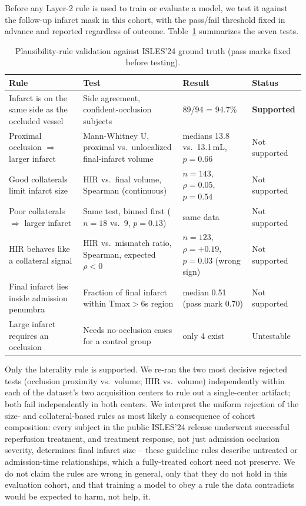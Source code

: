 \documentclass[conference]{IEEEtran}
\begin{document}
Before any Layer-2 rule is used to train or evaluate a model, we test it against the follow-up infarct mask in this cohort, with the pass/fail threshold fixed in advance and reported regardless of outcome. Table~\ref{tab:rules} summarizes the seven tests.

\begin{table}[t]
\centering
\caption{Plausibility-rule validation against ISLES'24 ground truth (pass marks fixed before testing).}
\label{tab:rules}
\begin{tabular}{p{4.6cm}p{4.6cm}p{3.2cm}p{2cm}}
\toprule
\textbf{Rule} & \textbf{Test} & \textbf{Result} & \textbf{Status} \\
\midrule
Infarct is on the same side as the occluded vessel & Side agreement, confident-occlusion subjects & 89/94 = 94.7\% & \textbf{Supported} \\
Proximal occlusion $\Rightarrow$ larger infarct & Mann-Whitney U, proximal vs.\ unlocalized final-infarct volume & medians 13.8 vs.\ 13.1\,mL, $p=0.66$ & Not supported \\
Good collaterals limit infarct size & HIR vs.\ final volume, Spearman (continuous) & $n=143$, $\rho=0.05$, $p=0.54$ & Not supported \\
Poor collaterals $\Rightarrow$ larger infarct & Same test, binned first ($n=18$ vs.\ 9, $p=0.13$) & same data & Not supported \\
HIR behaves like a collateral signal & HIR vs.\ mismatch ratio, Spearman, expected $\rho<0$ & $n=123$, $\rho=+0.19$, $p=0.03$ (wrong sign) & Not supported \\
Final infarct lies inside admission penumbra & Fraction of final infarct within Tmax$>$6s region & median 0.51 (pass mark 0.70) & Not supported \\
Large infarct requires an occlusion & Needs no-occlusion cases for a control group & only 4 exist & Untestable \\
\bottomrule
\end{tabular}
\end{table}

Only the laterality rule is supported. We re-ran the two most decisive rejected tests (occlusion proximity vs.\ volume; HIR vs.\ volume) independently within each of the dataset's two acquisition centers to rule out a single-center artifact; both fail independently in both centers. We interpret the uniform rejection of the size- and collateral-based rules as most likely a consequence of cohort composition: every subject in the public ISLES'24 release underwent successful reperfusion treatment, and treatment response, not just admission occlusion severity, determines final infarct size -- these guideline rules describe untreated or admission-time relationships, which a fully-treated cohort need not preserve. We do not claim the rules are wrong in general, only that they do not hold in this evaluation cohort, and that training a model to obey a rule the data contradicts would be expected to harm, not help, it.
\end{document}
